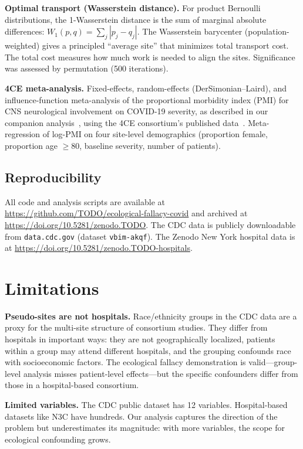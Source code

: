\documentclass{article}
\begin{document}
\textbf{Optimal transport (Wasserstein distance).}  For product Bernoulli
distributions, the 1-Wasserstein distance is the sum of marginal absolute
differences: $W_1(p, q) = \sum_j |p_j - q_j|$.  The Wasserstein barycenter
(population-weighted) gives a principled ``average site'' that minimizes total
transport cost.  The total cost measures how much work is needed to align the
sites.  Significance was assessed by permutation (500 iterations).

\textbf{4CE meta-analysis.}  Fixed-effects, random-effects (DerSimonian--Laird),
and influence-function meta-analysis of the proportional morbidity index (PMI)
for CNS neurological involvement on COVID-19 severity, as described in our
companion analysis~\cite{tower2026sitelevel}, using the 4CE consortium's published data~\cite{four_ce_neuro2021}.  Meta-regression of log-PMI on
four site-level demographics (proportion female, proportion age $\geq 80$,
baseline severity, number of patients).


\subsection{Reproducibility}

All code and analysis scripts are available at
\url{https://github.com/TODO/ecological-fallacy-covid} and archived at
\url{https://doi.org/10.5281/zenodo.TODO}.
The CDC data is publicly downloadable from
\texttt{data.cdc.gov} (dataset \texttt{vbim-akqf}).  The Zenodo New York hospital data is at
\url{https://doi.org/10.5281/zenodo.TODO-hospitals}.


\section{Limitations}

\textbf{Pseudo-sites are not hospitals.}  Race/ethnicity groups in the CDC
data are a proxy for the multi-site structure of consortium studies.  They
differ from hospitals in important ways: they are not geographically
localized, patients within a group may attend different hospitals, and the
grouping confounds race with socioeconomic factors.  The ecological fallacy
demonstration is valid---group-level analysis misses patient-level
effects---but the specific confounders differ from those in a hospital-based
consortium.

\textbf{Limited variables.}  The CDC public dataset has 12 variables.
Hospital-based datasets like N3C have hundreds.  Our analysis captures the
direction of the problem but underestimates its magnitude: with more
variables, the scope for ecological confounding grows.
\end{document}
